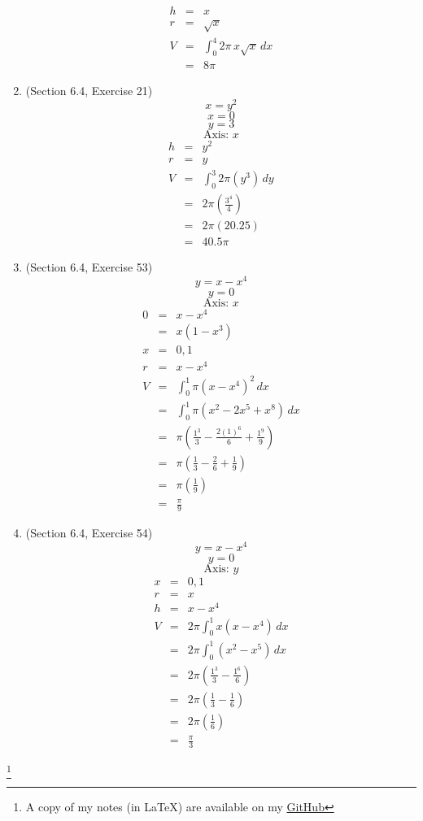 \documentclass{article}
\newcommand\blfootnote[1]{
    \begingroup
    \renewcommand\thefootnote{}\footnote{#1}
    \addtocounter{footnote}{-1}
    \endgroup
}
\begin{document}
\begin{enumerate}
        \begin{eqnarray}
            h &=& x \\
            r &=& \sqrt{x} \\
            V &=& \int_0^4{2\pi\,x\sqrt{x}\,dx} \\
              &=& 8\pi
        \end{eqnarray}
    \item (Section 6.4, Exercise 21)
        $$x = y^2$$
        $$x = 0$$
        $$y = 3$$
        $$\text{Axis: } x$$
        \begin{eqnarray}
            h &=& y^2 \\
            r &=& y \\
            V &=& \int_0^3{2\pi\left(y^3\right)\,dy} \\
              &=& 2\pi\left(\frac{3^4}{4}\right) \\
              &=& 2\pi\left(20.25\right) \\
              &=& 40.5\pi
        \end{eqnarray}
    \item (Section 6.4, Exercise 53)
        $$y = x - x^4$$
        $$y = 0$$
        $$\text{Axis: } x$$
        \begin{eqnarray}
            0 &=& x - x^4 \\
              &=& x\left(1 - x^3\right) \\
            x &=& 0, 1 \\
            r &=& x - x^4 \\
            V &=& \int_0^1{\pi\left(x - x^4\right)^2\,dx} \\
              &=& \int_0^1{\pi\left(x^2 - 2x^5 + x^8\right)\,dx} \\
              &=& \pi\left(\frac{1^3}{3} - \frac{2(1)^6}{6} + \frac{1^9}{9}\right) \\
              &=& \pi\left(\frac{1}{3} - \frac{2}{6} + \frac{1}{9}\right) \\
              &=& \pi\left(\frac{1}{9}\right) \\
              &=& \frac{\pi}{9}
        \end{eqnarray}
    \item (Section 6.4, Exercise 54)
        $$y = x - x^4$$
        $$y = 0$$
        $$\text{Axis: } y$$
        \begin{eqnarray}
            x &=& 0, 1 \\
            r &=& x \\
            h &=& x - x^4 \\
            V &=& 2\pi\int_0^1{x\left(x - x^4\right)\,dx} \\
              &=& 2\pi\int_0^1{\left(x^2 - x^5\right)\,dx} \\
              &=& 2\pi\left(\frac{1^3}{3} - \frac{1^6}{6}\right) \\
              &=& 2\pi\left(\frac{1}{3} - \frac{1}{6}\right) \\
              &=& 2\pi\left(\frac{1}{6}\right) \\
              &=& \frac{\pi}{3}
        \end{eqnarray}
\end{enumerate}

\blfootnote{A copy of my notes (in \LaTeX) are available on my \href{https://github.com/onlinechronically/MATH-211}{GitHub}}
\end{document}
